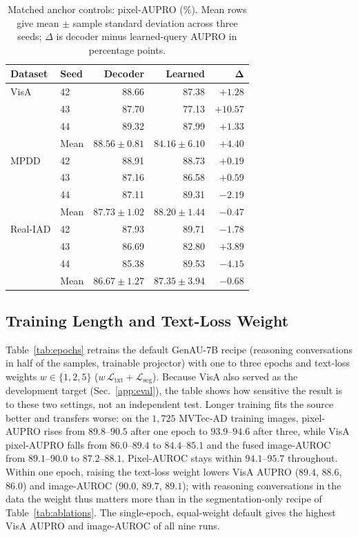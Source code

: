 \begin{table}[t]
\centering
\small
\setlength{\tabcolsep}{3pt}
\caption{Matched anchor controls: pixel-AUPRO (\%). Mean rows give mean $\pm$ sample standard deviation across three seeds; $\Delta$ is decoder minus learned-query AUPRO in percentage points.}
\label{tab:anchor_seeds}
\begin{tabular}{@{}llrrr@{}}
\toprule
\textbf{Dataset} & \textbf{Seed} & \textbf{Decoder} & \textbf{Learned} & $\boldsymbol{\Delta}$ \\
\midrule
VisA & 42 & 88.66 & 87.38 & $+1.28$ \\
  & 43 & 87.70 & 77.13 & $+10.57$ \\
  & 44 & 89.32 & 87.99 & $+1.33$ \\
  & Mean & $88.56\pm0.81$ & $84.16\pm6.10$ & $+4.40$ \\
\midrule
MPDD & 42 & 88.91 & 88.73 & $+0.19$ \\
  & 43 & 87.16 & 86.58 & $+0.59$ \\
  & 44 & 87.11 & 89.31 & $-2.19$ \\
  & Mean & $87.73\pm1.02$ & $88.20\pm1.44$ & $-0.47$ \\
\midrule
Real-IAD & 42 & 87.93 & 89.71 & $-1.78$ \\
      & 43 & 86.69 & 82.80 & $+3.89$ \\
      & 44 & 85.38 & 89.53 & $-4.15$ \\
      & Mean & $86.67\pm1.27$ & $87.35\pm3.94$ & $-0.68$ \\
\bottomrule
\end{tabular}
\end{table}

\subsection{Training Length and Text-Loss Weight}
\label{app:epochs}
Table~\ref{tab:epochs} retrains the default GenAU-7B recipe (reasoning conversations in half of the samples, trainable projector) with one to three epochs and text-loss weights $w\in\{1,2,5\}$ ($w\,\mathcal{L}_{\mathrm{txt}}+\mathcal{L}_{\mathrm{seg}}$). Because VisA also served as the development target (Sec.~\ref{app:eval}), the table shows how sensitive the result is to these two settings, not an independent test. Longer training fits the source better and transfers worse: on the $1{,}725$ MVTec-AD training images, pixel-AUPRO rises from $89.8$--$90.5$ after one epoch to $93.9$--$94.6$ after three, while VisA pixel-AUPRO falls from $86.0$--$89.4$ to $84.4$--$85.1$ and the fused image-AUROC from $89.1$--$90.0$ to $87.2$--$88.1$. Pixel-AUROC stays within $94.1$--$95.7$ throughout. Within one epoch, raising the text-loss weight lowers VisA AUPRO ($89.4$, $88.6$, $86.0$) and image-AUROC ($90.0$, $89.7$, $89.1$); with reasoning conversations in the data the weight thus matters more than in the segmentation-only recipe of Table~\ref{tab:ablations}. The single-epoch, equal-weight default gives the highest VisA AUPRO and image-AUROC of all nine runs.

